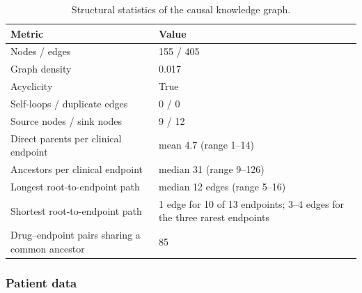 \begin{table}[htbp]
    \centering
    \caption{Structural statistics of the causal knowledge graph.}
    \label{tab:dag_structural_stats}
    \begin{tabularx}{\textwidth}{@{}l X@{}}
        \toprule
        \textbf{Metric} & \textbf{Value} \\
        \midrule
        Nodes / edges & 155 / 405 \\
        Graph density & 0.017 \\
        Acyclicity  & True \\
        Self-loops / duplicate edges & 0 / 0 \\
        Source nodes / sink nodes & 9 / 12 \\
        Direct parents per clinical endpoint & mean 4.7 (range 1--14) \\
        Ancestors per clinical endpoint & median 31 (range 9--126) \\
        Longest root-to-endpoint path & median 12 edges (range 5--16) \\
        Shortest root-to-endpoint path & 1 edge for 10 of 13 endpoints; 3--4 edges for the three rarest endpoints \\
        Drug--endpoint pairs sharing a common ancestor & 85 \\
        \bottomrule
    \end{tabularx}
\end{table}



\subsubsection{Patient data}
\label{subsec:generation}

